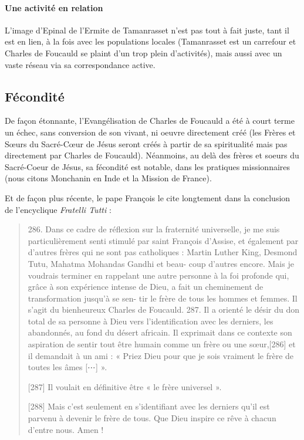 \paragraph{Une activité en relation} L'image d'Epinal de l'Ermite de Tamanrasset n'est pas tout à fait juste, tant il est en lien, à la fois avec les populations locales (Tamanrasset est un carrefour et Charles de Foucauld se plaint d'un trop plein d'activités), mais aussi avec un vaste réseau via sa correspondance active. 



\subsection{Fécondité}
De façon étonnante, l'Evangélisation de Charles de Foucauld a été à court terme un échec, sans conversion de son vivant, ni oeuvre directement créé (les Frères et Sœurs du Sacré-Cœur de Jésus seront créés à partir de sa spiritualité mais pas directement par Charles de Foucauld). Néanmoins, au delà des frères et soeurs du Sacré-Coeur de Jésus, sa fécondité est  notable, dans les pratiques missionnaires (nous citons Monchanin en Inde et la Mission de France).

Et de façon plus récente, le pape François le cite longtement dans la conclusion de l'encyclique \textit{Fratelli Tutti} : 

\begin{quote}
    286. Dans ce cadre de réflexion sur la fraternité universelle, je me
suis particulièrement senti stimulé par saint François d’Assise, et
également par d’autres frères qui ne sont pas catholiques : Martin
Luther King, Desmond Tutu, Mahatma Mohandas Gandhi et beau-
coup d’autres encore. Mais je voudrais terminer en rappelant une
autre personne à la foi profonde qui, grâce à son expérience intense
de Dieu, a fait un cheminement de transformation jusqu’à se sen-
tir le frère de tous les hommes et femmes. Il s’agit du bienheureux
Charles de Foucauld.
287. Il a orienté le désir du don total de sa personne à Dieu vers
l’identification avec les derniers, les abandonnés, au fond du désert
africain. Il exprimait dans ce contexte son aspiration de sentir tout
être humain comme un frère ou une sœur,[286] et il demandait à
un ami : « Priez Dieu pour que je sois vraiment le frère de toutes
les âmes [⋯] ».

[287] Il voulait en définitive être « le frère universel
».

[288] Mais c’est seulement en s’identifiant avec les derniers qu’il
est parvenu à devenir le frère de tous. Que Dieu inspire ce rêve à
chacun d’entre nous. Amen !
\end{quote}